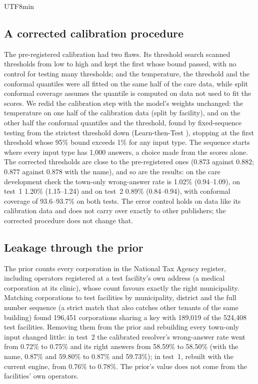 \documentclass[10pt]{article}
\begin{document}
\begin{CJK}{UTF8}{min}
\subsection{A corrected calibration procedure}\label{sec:recal}
The pre-registered calibration had two flaws. Its threshold search scanned thresholds from low to high and
kept the first whose bound passed, with no control for testing many thresholds; and the temperature, the
threshold and the conformal quantiles were all fitted on the same half of the care data, while split
conformal coverage assumes the quantile is computed on data not used to fit the scores. We redid the
calibration step with the model's weights unchanged: the temperature on one half of the calibration data
(split by facility), and on the other half the conformal quantiles and the threshold, found by
fixed-sequence testing from the strictest threshold down (Learn-then-Test \cite{ltt}), stopping at the first
threshold whose 95\% bound exceeds 1\% for any input type. The sequence starts where every input type has
1,000 answers, a choice made from the scores alone. The corrected thresholds are close to the
pre-registered ones (0.873 against 0.882; 0.877 against 0.878 with the name), and so are the results: on
the care development check the town-only wrong-answer rate is 1.02\% (0.94--1.09), on test~1 1.20\%
(1.15--1.24) and on test~2 0.89\% (0.84--0.94), with conformal coverage of 93.6--93.7\% on both tests. The
error control holds on data like its calibration data and does not carry over exactly to other
publishers; the corrected procedure does not change that.

\subsection{Leakage through the prior}
The prior counts every corporation in the National Tax Agency register, including operators registered
at a test facility's own address (a medical corporation at its clinic), whose count favours exactly the
right municipality. Matching corporations to test facilities by municipality, district and the full
number sequence (a strict match that also catches other tenants of the same building) found 196,451
corporations sharing a key with 189,019 of the 524,408 test facilities. Removing them from the prior and
rebuilding every town-only input changed little: in test~2 the calibrated resolver's wrong-answer rate went
from 0.72\% to 0.75\% and its right answers from 58.59\% to 58.50\% (with the name, 0.87\% and 59.80\% to
0.87\% and 59.73\%); in test~1, rebuilt with the current engine, from 0.76\% to 0.78\%. The prior's value
does not come from the facilities' own operators.


\end{CJK}
\end{document}
